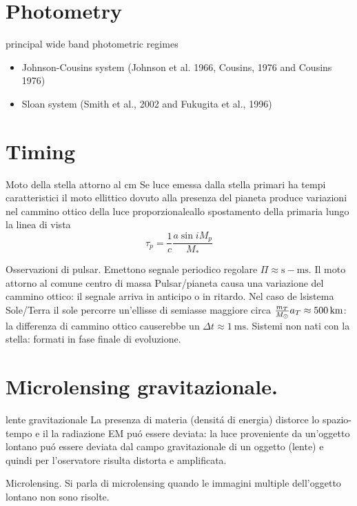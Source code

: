 \section{Photometry}

\begin{frame}{principal wide band photometric regimes}
\cite{mallama2017comprehensive}
\begin{itemize}
\item Johnson-Cousins system (Johnson et al. 1966, Cousins, 1976 and Cousins 1976)
\item Sloan system (Smith et al., 2002 and Fukugita et al., 1996)
\end{itemize}
\end{frame}



\section{Timing}

\begin{frame}{Moto della stella attorno al cm}
Se luce emessa dalla stella primari ha tempi caratteristici il moto ellittico dovuto alla presenza del pianeta produce variazioni nel cammino ottico della luce proporzionaleallo spostamento della primaria lungo la linea di vista
\begin{equation*}
    \tau_p=\frac{1}{c}\frac{a\sin{i}M_p}{M_*}
\end{equation*}
\end{frame}

\begin{frame}{Osservazioni di pulsar.}
Emettono segnale periodico regolare $\Pi\approx\si{\second}-\si{\milli\second}$. Il moto attorno al comune centro di massa Pulsar/pianeta causa una variazione del cammino ottico: il segnale arriva in anticipo o in ritardo.
Nel caso de lsistema Sole/Terra il sole percorre un'ellisse di semiasse maggiore circa $\frac{m_T}{M_{\odot}{}}a_T\approx\SI{500}{\kilo\meter}$: la differenza di cammino ottico causerebbe un $\Delta t\approx\SI{1}{\milli\second}$.
Sistemi non nati con la stella: formati in fase finale di evoluzione.
\end{frame}

\section{Microlensing gravitazionale.}

\begin{frame}{lente gravitazionale}
La presenza di materia (densit\'a di energia) distorce lo spazio-tempo e il la radiazione EM pu\'o essere deviata: la luce proveniente da un'oggetto lontano pu\'o essere deviata dal campo gravitazionale di un oggetto (lente) e quindi per l'oservatore risulta distorta e amplificata. 

\begin{definition}{Microlensing.}
Si parla di microlensing quando le immagini multiple dell'oggetto lontano non sono risolte.
\end{definition}
\end{frame}


